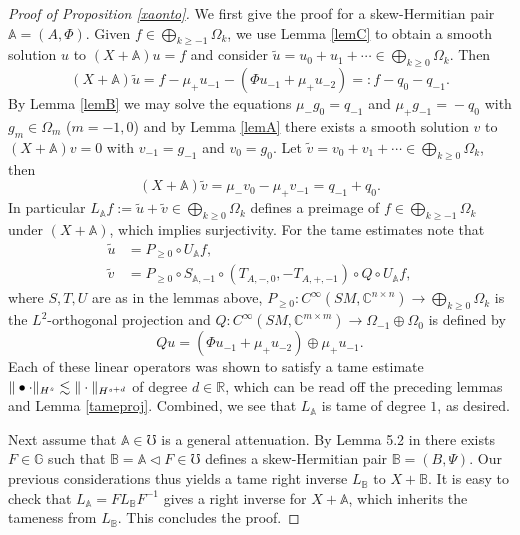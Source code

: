 \documentclass[JEP,XML,SOM,Unicode,published]{cedram}
\theoremstyle{plain}
\theoremstyle{definition}
\newcommand{\A}{\mathbb{A}}
\newcommand{\B}{\mathbb{B}}
\newcommand{\G}{\mathbb{G}}
\newcommand{\R}{\mathbb{R}}
\newcommand{\C}{\mathbb{C}}
\newcommand{\1}{{\bf 1}}
\let\act\triangleleft
\begin{document}
\begin{proof}[Proof of Proposition \ref{xaonto}]
We first give the proof for a skew-Hermitian pair $\A=(A,\Phi)$. Given $f\in \bigoplus_{k\ge -1}\Omega_k$, we use Lemma \ref{lemC} to obtain a smooth solution $u$ to $(X+\A)u=f$ and consider $\tilde u = u_0 + u_1 +\cdots\in \bigoplus_{k\ge 0}\Omega_k$. Then\begin{equation*}
(X+\A) \tilde u = f - \mu_+ u_{-1} - \left(\Phi u_{-1} + \mu_+ u_{-2} \right) =: f - q_{0} - q_{-1}.
\end{equation*}
By Lemma \ref{lemB} we may solve the equations $\mu_- g_0 \!=\! q_{-1}$ and $\mu_+ g_{-1} \!=\! - q_0$ with $g_{m}\!\in\! \Omega_{m}$ ($m=-1,0$) and by Lemma \ref{lemA} there exists a smooth solution $v$ to $(X+\A)v=0$ with $v_{-1}=g_{-1}$ and $v_{0}=g_0$. Let $\tilde v = v_0 + v_1 +\cdots\in \bigoplus_{k\ge 0}\Omega_k$, then
\begin{equation*}
(X+\A) \tilde v = \mu_-v_0 - \mu_+v_{-1} = q_{-1} + q_0.
\end{equation*}
In particular $L_\A f := \tilde u + \tilde v \in \bigoplus_{k\ge 0}\Omega_k$ defines a preimage of $f\in \bigoplus_{k\ge -1}\Omega_k$ under $(X+\A)$, which implies surjectivity. For the tame estimates note that
\begin{equation*}
\begin{split}
\tilde u &= P_{\ge 0}\circ U_\A f,\\
\tilde v &= P_{\ge 0} \circ S_{\A,-1} \circ (T_{A,-,0}, - T_{A,+,{-1}})\circ Q\circ U_\A f,
\end{split}
\end{equation*}
where $S,T,U$ are as in the lemmas above, $P_{\ge 0}:C^\infty(SM,\C^{n\times n})\to \bigoplus_{k\ge 0}\Omega_k$ is the $L^2$-orthogonal projection and $Q:C^\infty(SM,\C^{m\times m})\to \Omega_{-1} \oplus \Omega_0$ is defined by
\begin{equation*}
Q u = (\Phi u_{-1} + \mu_+u_{-2}) \oplus \mu_+u_{-1}.
\end{equation*}
Each of these linear operators was shown to satisfy a tame estimate $\Vert \bullet \cdot \Vert_{H^s} \lesssim \Vert \cdot\nobreak \Vert_{H^{s+d}}$ of degree $d\in \R$, which can be read off the preceding lemmas and Lemma \ref{tameproj}. Combined, we see that $L_\A$ is tame of degree $1$, as desired.

Next assume that $\A\in \mho$ is a general attenuation. By Lemma 5.2 in \cite{PaSa20} there exists $F\in \G$ such that $\B=\A\act F\in \mho$ defines a skew-Hermitian pair $\B=(B,\Psi)$. Our previous considerations thus yields a tame right inverse $L_\B$ to $X+\B$. It is easy to check that $L_\A = FL_\B F^{-1}$ gives a right inverse for $X+\A$, which inherits the tameness from $L_\B$. This concludes the proof.\end{proof}
\end{document}
